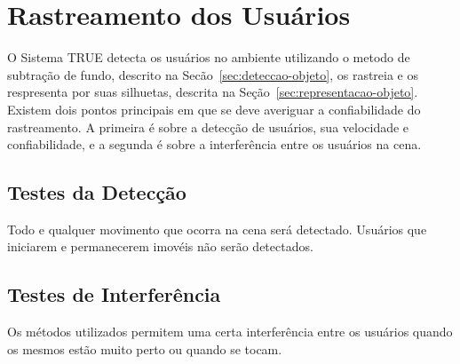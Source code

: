 \section{Rastreamento dos Usuários}

	O Sistema TRUE detecta os usuários no ambiente utilizando o metodo de subtração
	de fundo, descrito na Secão~\ref{sec:deteccao-objeto}, os rastreia e os
	respresenta por suas silhuetas, descrita na	Seção~\ref{sec:representacao-objeto}.
	Existem dois pontos principais em que se deve averiguar a confiabilidade do
	rastreamento. A primeira é sobre a detecção de usuários, sua velocidade e
	confiabilidade, e a segunda é sobre a interferência entre os usuários na cena.
	
	\subsection{Testes da Detecção}
	
		Todo e qualquer movimento que ocorra na cena será detectado. Usuários que
		iniciarem e permanecerem imovéis não serão detectados.
		
		
	\subsection{Testes de Interferência}
	
		Os métodos utilizados permitem uma certa interferência entre os usuários
		quando os mesmos estão muito perto ou quando se tocam.
	
	
